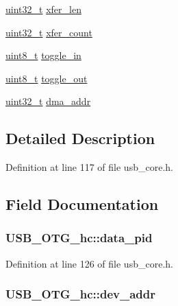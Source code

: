 \begin{DoxyCompactItemize}
\hyperlink{stdint_8h_a435d1572bf3f880d55459d9805097f62}{uint32\-\_\-t} \hyperlink{struct_u_s_b___o_t_g__hc_afedb2678557cea89141ff14160e78a70}{xfer\-\_\-len}
\item 
\hyperlink{stdint_8h_a435d1572bf3f880d55459d9805097f62}{uint32\-\_\-t} \hyperlink{struct_u_s_b___o_t_g__hc_acd53c63ab99eebe6cd96c3e0af60ce3f}{xfer\-\_\-count}
\item 
\hyperlink{stdint_8h_aba7bc1797add20fe3efdf37ced1182c5}{uint8\-\_\-t} \hyperlink{struct_u_s_b___o_t_g__hc_a95b90ad5659d70e73fc7d63f080ddd40}{toggle\-\_\-in}
\item 
\hyperlink{stdint_8h_aba7bc1797add20fe3efdf37ced1182c5}{uint8\-\_\-t} \hyperlink{struct_u_s_b___o_t_g__hc_a5e587d7f590c3afa1213588690b5c7aa}{toggle\-\_\-out}
\item 
\hyperlink{stdint_8h_a435d1572bf3f880d55459d9805097f62}{uint32\-\_\-t} \hyperlink{struct_u_s_b___o_t_g__hc_a2ba984cead476ce16f712b6a860ce556}{dma\-\_\-addr}
\end{DoxyCompactItemize}


\subsection{Detailed Description}


Definition at line 117 of file usb\-\_\-core.\-h.



\subsection{Field Documentation}
\hypertarget{struct_u_s_b___o_t_g__hc_a64fbfbe0cf9526d30649604ad9268726}{
\subsubsection[{data\-\_\-pid}]{ U\-S\-B\-\_\-\-O\-T\-G\-\_\-hc\-::data\-\_\-pid}}\label{struct_u_s_b___o_t_g__hc_a64fbfbe0cf9526d30649604ad9268726}


Definition at line 126 of file usb\-\_\-core.\-h.

\hypertarget{struct_u_s_b___o_t_g__hc_ab192566d22b5b4eea4347fa5a0db3c89}{
\subsubsection[{dev\-\_\-addr}]{ U\-S\-B\-\_\-\-O\-T\-G\-\_\-hc\-::dev\-\_\-addr}}\label{struct_u_s_b___o_t_g__hc_ab192566d22b5b4eea4347fa5a0db3c89}


